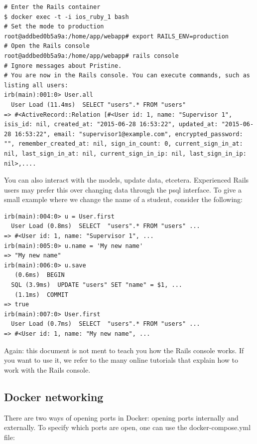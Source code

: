 \begin{verbatim}
# Enter the Rails container
$ docker exec -t -i ios_ruby_1 bash
# Set the mode to production
root@addbed0b5a9a:/home/app/webapp# export RAILS_ENV=production
# Open the Rails console
root@addbed0b5a9a:/home/app/webapp# rails console
# Ignore messages about Pristine.
# You are now in the Rails console. You can execute commands, such as listing all users:
irb(main):001:0> User.all
  User Load (11.4ms)  SELECT "users".* FROM "users"
=> #<ActiveRecord::Relation [#<User id: 1, name: "Supervisor 1", isis_id: nil, created_at: "2015-06-28 16:53:22", updated_at: "2015-06-28 16:53:22", email: "supervisor1@example.com", encrypted_password: "", remember_created_at: nil, sign_in_count: 0, current_sign_in_at: nil, last_sign_in_at: nil, current_sign_in_ip: nil, last_sign_in_ip: nil>,....
\end{verbatim}

You can also interact with the models, update data, etcetera. Experienced Rails users may prefer this over changing data through the psql interface. To give a small example where we change the name of a student, consider the following:

\begin{verbatim}
irb(main):004:0> u = User.first
  User Load (0.8ms)  SELECT  "users".* FROM "users" ...
=> #<User id: 1, name: "Supervisor 1", ...
irb(main):005:0> u.name = 'My new name'
=> "My new name"
irb(main):006:0> u.save
   (0.6ms)  BEGIN
  SQL (3.9ms)  UPDATE "users" SET "name" = $1, ...
   (1.1ms)  COMMIT
=> true
irb(main):007:0> User.first
  User Load (0.7ms)  SELECT  "users".* FROM "users" ...
=> #<User id: 1, name: "My new name", ...
\end{verbatim}


Again: this document is not ment to teach you how the Rails console works. If you want to use it, we refer to the many online tutorials that explain how to work with the Rails console.

\subsection{Docker networking}
There are two ways of opening ports in Docker: opening ports internally and externally. To specify which ports are open, one can use the docker-compose.yml file:

